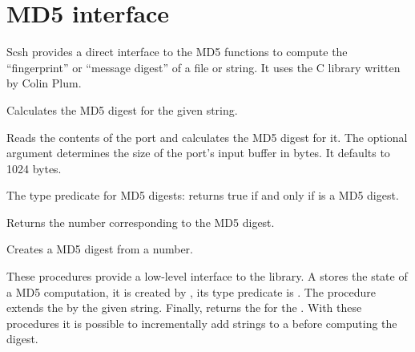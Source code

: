 \section{MD5 interface}
\label{sec:md5}

Scsh provides a direct interface to the MD5 functions to compute the
``fingerprint'' or ``message digest'' of a file or string. It uses the
C library written by Colin Plum.

\begin{desc}
  Calculates the MD5 digest for the given string.
\end{desc}
\begin{desc}
  Reads the contents of the port and calculates the MD5 digest for it.
  The optional argument  determines the size of the
  port's input buffer in bytes. It defaults to 1024 bytes.
\end{desc}

\begin{desc}
  The type predicate for MD5 digests:  returns true if
  and only if  is a MD5 digest.
\end{desc}
\begin{desc}
  Returns the number corresponding to the MD5 digest.
\end{desc}
\begin{desc}
  Creates a MD5 digest from a number.
\end{desc}

\undefined
{}
\begin{desc}
  These procedures provide a low-level interface to the library. A
   stores the state of a MD5 computation, it is
  created by , its type predicate is
  . The procedure  extends
  the  by the given string. Finally,
   returns the  for the
  . With these procedures it is possible to
  incrementally add strings to a  before computing
  the digest.
\end{desc}

